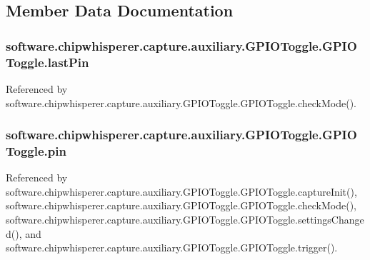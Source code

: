 \subsection{Member Data Documentation}
\hypertarget{classsoftware_1_1chipwhisperer_1_1capture_1_1auxiliary_1_1GPIOToggle_1_1GPIOToggle_a155ed7fa16ffb1a2e785c525bc6c7bb6}{}
\subsubsection[{last\+Pin}]{\setlength{\rightskip}{0pt plus 5cm}software.\+chipwhisperer.\+capture.\+auxiliary.\+G\+P\+I\+O\+Toggle.\+G\+P\+I\+O\+Toggle.\+last\+Pin}\label{classsoftware_1_1chipwhisperer_1_1capture_1_1auxiliary_1_1GPIOToggle_1_1GPIOToggle_a155ed7fa16ffb1a2e785c525bc6c7bb6}


Referenced by software.\+chipwhisperer.\+capture.\+auxiliary.\+G\+P\+I\+O\+Toggle.\+G\+P\+I\+O\+Toggle.\+check\+Mode().

\hypertarget{classsoftware_1_1chipwhisperer_1_1capture_1_1auxiliary_1_1GPIOToggle_1_1GPIOToggle_a10d8d62ca74fa399234614393232ee5b}{}
\subsubsection[{pin}]{\setlength{\rightskip}{0pt plus 5cm}software.\+chipwhisperer.\+capture.\+auxiliary.\+G\+P\+I\+O\+Toggle.\+G\+P\+I\+O\+Toggle.\+pin}\label{classsoftware_1_1chipwhisperer_1_1capture_1_1auxiliary_1_1GPIOToggle_1_1GPIOToggle_a10d8d62ca74fa399234614393232ee5b}


Referenced by software.\+chipwhisperer.\+capture.\+auxiliary.\+G\+P\+I\+O\+Toggle.\+G\+P\+I\+O\+Toggle.\+capture\+Init(), software.\+chipwhisperer.\+capture.\+auxiliary.\+G\+P\+I\+O\+Toggle.\+G\+P\+I\+O\+Toggle.\+check\+Mode(), software.\+chipwhisperer.\+capture.\+auxiliary.\+G\+P\+I\+O\+Toggle.\+G\+P\+I\+O\+Toggle.\+settings\+Changed(), and software.\+chipwhisperer.\+capture.\+auxiliary.\+G\+P\+I\+O\+Toggle.\+G\+P\+I\+O\+Toggle.\+trigger().


